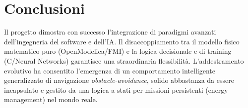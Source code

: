 ﻿\documentclass[12pt,a4paper]{article}
\begin{document}
\section{Conclusioni}
Il progetto dimostra con successo l'integrazione di paradigmi avanzati dell'ingegneria del software e dell'IA. Il disaccoppiamento tra il modello fisico matematico puro (OpenModelica/FMI) e la logica decisionale e di training (C/Neural Networks) garantisce una straordinaria flessibilità. L'addestramento evolutivo ha consentito l'emergenza di un comportamento intelligente generalizzato di navigazione \textit{obstacle-avoidance}, solido abbastanza da essere incapsulato e gestito da una logica a stati per missioni persistenti (energy management) nel mondo reale.
\end{document}
